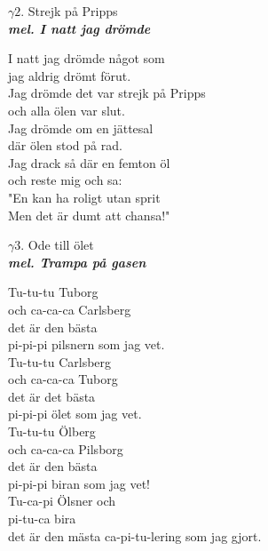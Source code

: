\documentclass[a6paper,10pt]{article}
\newcommand{\mel}[1]{\small\textbf{\textit{mel. #1 \\}}}
\begin{document}
\setlength{\oddsidemargin}{-0.47in}
\begin{center}
\Large $\gamma2$. Strejk på Pripps \\ 
\mel{I natt jag drömde}
\end{center}
I natt jag drömde något som\\
jag aldrig drömt förut.\\
Jag drömde det var strejk på Pripps\\
och alla ölen var slut.
\vspace{5pt}\\
Jag drömde om en jättesal\\
där ölen stod på rad.\\
Jag drack så där en femton öl\\
och reste mig och sa:
\vspace{5pt}\\
"En kan ha roligt utan sprit\\
Men det är dumt att chansa!"
\begin{center}
\Large $\gamma3$. Ode till ölet \\ 
\mel{Trampa på gasen}
\end{center}
Tu-tu-tu Tuborg\\
och ca-ca-ca Carlsberg\\
det är den bästa \\
pi-pi-pi pilsnern som jag vet.
\vspace{5pt} \\
Tu-tu-tu Carlsberg\\
och ca-ca-ca Tuborg\\
det är det bästa\\
pi-pi-pi ölet som jag vet.
\vspace{5pt} \\
Tu-tu-tu Ölberg\\
och ca-ca-ca Pilsborg\\
det är den bästa \\
pi-pi-pi biran som jag vet!
\vspace{5pt}\\
Tu-ca-pi Ölsner och \\
pi-tu-ca bira\\
det är den mästa ca-pi-tu-lering som jag gjort.
\end{document}
